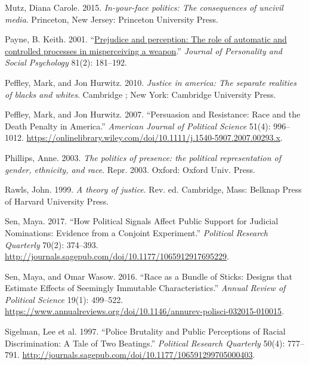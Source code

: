 \documentclass[
  12pt,
]{article}
\newlength{\cslhangindent}
\newlength{\cslentryspacingunit} %
\newenvironment{CSLReferences}[2] %
 {%
  \setlength{\parindent}{0pt}
  \ifodd #1
  \let\oldpar\par
  \def\par{\hangindent=\cslhangindent\oldpar}
  \fi
  \setlength{\parskip}{#2\cslentryspacingunit}
 }%
 {}
\begin{document}
\begin{CSLReferences}{1}{0}
\leavevmode{}%
Mutz, Diana Carole. 2015. \emph{In-your-face politics: The consequences
of uncivil media}. Princeton, New Jersey: Princeton University Press.

\leavevmode{}%
Payne, B. Keith. 2001.
{``\href{https://doi.org/10.1037/0022-3514.81.2.181}{Prejudice and
perception: The role of automatic and controlled processes in
misperceiving a weapon}.''} \emph{Journal of Personality and Social
Psychology} 81(2): 181--192.

\leavevmode{}%
Peffley, Mark, and Jon Hurwitz. 2010. \emph{Justice in america: The
separate realities of blacks and whites}. Cambridge ; New York:
Cambridge University Press.

\leavevmode{}%
Peffley, Mark, and Jon Hurwitz. 2007. {``Persuasion and Resistance: Race
and the Death Penalty in America.''} \emph{American Journal of Political
Science} 51(4): 996--1012.
\url{https://onlinelibrary.wiley.com/doi/10.1111/j.1540-5907.2007.00293.x}.

\leavevmode{}%
Phillips, Anne. 2003. \emph{The politics of presence: the political
representation of gender, ethnicity, and race}. Repr. 2003. Oxford:
Oxford Univ. Press.

\leavevmode{}%
Rawls, John. 1999. \emph{A theory of justice}. Rev. ed. Cambridge, Mass:
Belknap Press of Harvard University Press.

\leavevmode{}%
Sen, Maya. 2017. {``How Political Signals Affect Public Support for
Judicial Nominations: Evidence from a Conjoint Experiment.''}
\emph{Political Research Quarterly} 70(2): 374--393.
\url{http://journals.sagepub.com/doi/10.1177/1065912917695229}.

\leavevmode{}%
Sen, Maya, and Omar Wasow. 2016. {``Race as a Bundle of Sticks: Designs
that Estimate Effects of Seemingly Immutable Characteristics.''}
\emph{Annual Review of Political Science} 19(1): 499--522.
\url{https://www.annualreviews.org/doi/10.1146/annurev-polisci-032015-010015}.

\leavevmode{}%
Sigelman, Lee et al. 1997. {``Police Brutality and Public Perceptions of
Racial Discrimination: A Tale of Two Beatings.''} \emph{Political
Research Quarterly} 50(4): 777--791.
\url{http://journals.sagepub.com/doi/10.1177/106591299705000403}.


\end{CSLReferences}
\end{document}
